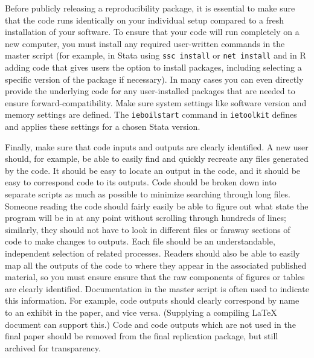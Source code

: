 Before publicly releasing a reproducibility package,
it is essential to make sure that the code runs identically
on your individual setup compared to
a fresh installation of your software.
To ensure that your code will run completely on a new computer,
you must install any required user-written commands in the master script
(for example, in Stata using \texttt{ssc install} or \texttt{net install}
and in R adding code that gives users the option to install packages,
including selecting a specific version of the package if necessary).
In many cases you can even directly provide the underlying code
for any user-installed packages that are needed to ensure forward-compatibility.
Make sure system settings like software version and memory settings are defined.
The \texttt{ieboilstart} command in \texttt{ietoolkit} defines and applies these settings
for a chosen Stata version.

Finally, make sure that code inputs and outputs are clearly identified.
A new user should, for example, be able to easily find and quickly recreate
any files generated by the code.
It should be easy to locate an output in the code,
and it should be easy to correspond code to its outputs.
Code should be broken down into separate scripts as much as possible
to minimize searching through long files.
Someone reading the code should fairly easily be able to figure out
what state the program will be in at any point
without scrolling through hundreds of lines;
similarly, they should not have to look in different files
or faraway sections of code to make changes to outputs.
Each file should be an understandable, independent selection of related processes.
Readers should also be able to easily map all the outputs of the code
to where they appear in the associated published material,
so you must ensure ensure that the raw components of figures or tables are clearly identified.
Documentation in the master script is often used to indicate this information.
For example, code outputs should clearly correspond by name to an exhibit in the paper, and vice versa.
(Supplying a compiling {\LaTeX} document can support this.)
Code and code outputs which are not used in the final paper should be removed from the final replication package,
but still archived for transparency.

